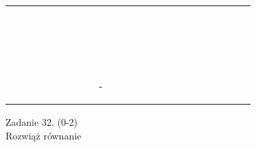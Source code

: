 \documentclass[10pt]{article}
\begin{document}
\begin{center}
\begin{tabular}{|c|c|c|c|c|c|c|c|c|c|c|c|c|c|c|c|c|c|c|c|c|c|}
\hline
 &  &  &  &  &  &  &  &  &  &  &  &  &  &  &  &  &  &  &  &  &  \\
\hline
 &  &  &  &  &  &  &  &  &  &  &  &  &  &  &  &  &  &  &  &  &  \\
\hline
 &  &  &  &  &  &  &  &  &  &  &  &  &  &  &  &  &  &  &  &  &  \\
\hline
 &  &  &  &  &  &  &  &  &  &  &  &  &  &  &  &  &  &  &  &  &  \\
\hline
 &  &  &  &  &  &  &  &  &  &  &  &  &  &  &  &  &  &  &  &  &  \\
\hline
 &  &  &  &  &  &  &  &  &  &  &  &  &  &  &  &  &  &  &  &  &  \\
\hline
 &  &  &  &  &  &  &  &  &  &  &  &  &  &  &  &  &  &  &  &  &  \\
\hline
 &  &  &  &  &  &  &  &  &  &  &  &  &  &  &  &  &  &  &  &  &  \\
\hline
 &  &  &  &  &  &  &  &  &  &  &  &  &  &  &  &  &  &  &  &  &  \\
\hline
 &  &  &  &  &  &  &  &  &  &  &  &  &  &  &  &  &  &  &  &  &  \\
\hline
 &  &  &  &  &  &  &  &  &  &  &  &  &  &  &  &  &  &  &  &  &  \\
\hline
 &  &  &  &  &  &  &  &  &  &  &  &  &  &  &  &  &  &  &  &  &  \\
\hline
 &  &  &  &  &  &  &  &  &  &  &  &  &  &  &  &  &  &  &  &  &  \\
\hline
 &  &  &  &  &  &  &  &  &  &  &  &  &  &  &  &  &  &  &  &  &  \\
\hline
 &  &  &  &  &  &  &  &  &  &  &  &  &  &  &  &  &  &  &  &  &  \\
\hline
 &  &  &  &  &  &  &  &  &  &  &  &  &  &  &  &  &  &  &  &  &  \\
\hline
 &  &  &  &  &  &  &  &  &  &  &  &  &  &  &  &  &  &  &  &  &  \\
\hline
 &  &  &  &  &  &  &  &  &  &  &  &  &  &  &  &  &  &  &  &  &  \\
\hline
 &  &  &  &  &  &  &  & - &  &  &  &  &  &  &  &  &  &  &  &  &  \\
\hline
 &  &  &  &  &  &  &  &  &  &  &  &  &  &  &  &  &  &  &  &  &  \\
\hline
 &  &  &  &  &  &  &  &  &  &  &  &  &  &  &  &  &  &  &  &  &  \\
\hline
\end{tabular}
\end{center}

Zadanie 32. (0-2)\\
Rozwiąż równanie
\end{document}
